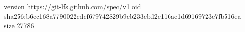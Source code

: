 version https://git-lfs.github.com/spec/v1
oid sha256:b6ce168a7790022cdcf679742829b9cb233cbd2e116ac1d69169723e7fb516ea
size 27786
